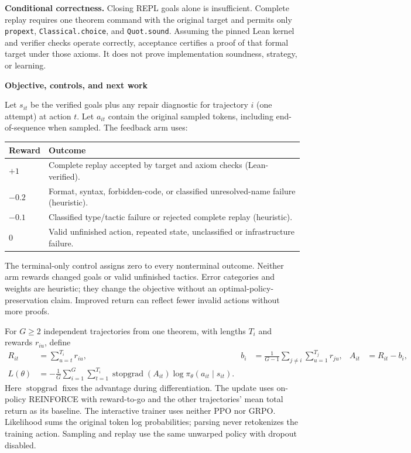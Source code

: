 \documentclass[11pt]{article}
\newcommand{\file}[1]{\nolinkurl{#1}}
\newcommand{\heading}[1]{\vspace{4pt}{\large\bfseries #1}\par}
\begin{document}
\textbf{Conditional correctness.}
Closing REPL goals alone is insufficient.
Complete replay requires one theorem command with the original target and permits only \file{propext}, \file{Classical.choice}, and \file{Quot.sound}.
Assuming the pinned Lean kernel and verifier checks operate correctly, acceptance certifies a proof of that formal target under those axioms.
It does not prove implementation soundness, strategy, or learning.

\newpage
{\Large\bfseries Objective, controls, and next work}\par
\heading{3. Use the implemented policy update}
Let $s_{it}$ be the verified goals plus any repair diagnostic for trajectory $i$ (one attempt) at action $t$.
Let $a_{it}$ contain the original sampled tokens, including end-of-sequence when sampled.
The feedback arm uses:

\begin{tabularx}{\linewidth}{@{}lY@{}}
\toprule
Reward & Outcome \\
\midrule
$+1$ & Complete replay accepted by target and axiom checks (Lean-verified). \\
$-0.2$ & Format, syntax, forbidden-code, or classified unresolved-name failure (heuristic). \\
$-0.1$ & Classified type/tactic failure or rejected complete replay (heuristic). \\
$0$ & Valid unfinished action, repeated state, unclassified or infrastructure failure. \\
\bottomrule
\end{tabularx}

The terminal-only control assigns zero to every nonterminal outcome.
Neither arm rewards changed goals or valid unfinished tactics.
Error categories and weights are heuristic; they change the objective without an optimal-policy-preservation claim.
Improved return can reflect fewer invalid actions without more proofs.

For $G\geq2$ independent trajectories from one theorem, with lengths $T_i$ and rewards $r_{iu}$, define
\begin{align*}
R_{it}&=\sum_{u=t}^{T_i}r_{iu},
& b_i&=\frac{1}{G-1}\sum_{j\ne i}\sum_{u=1}^{T_j}r_{ju},
& A_{it}&=R_{it}-b_i,\\
L(\theta)&=-\frac{1}{G}\sum_{i=1}^{G}\sum_{t=1}^{T_i}
\operatorname{stopgrad}(A_{it})\log\pi_\theta(a_{it}\mid s_{it}).
\end{align*}
Here $\operatorname{stopgrad}$ fixes the advantage during differentiation.
The update uses on-policy REINFORCE with reward-to-go and the other trajectories' mean total return as its baseline.
The interactive trainer uses neither PPO nor GRPO.
Likelihood sums the original token log probabilities; parsing never retokenizes the training action.
Sampling and replay use the same unwarped policy with dropout disabled.
\end{document}
